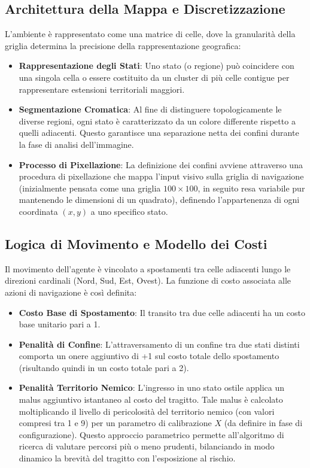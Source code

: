 \documentclass[12pt,a4paper]{article}
\begin{document}
	\subsection{Architettura della Mappa e Discretizzazione}
	L'ambiente è rappresentato come una matrice di celle, dove la granularità della griglia determina la precisione della rappresentazione geografica:
	\begin{itemize}
		\item \textbf{Rappresentazione degli Stati}: Uno stato (o regione) può coincidere con una singola cella o essere costituito da un cluster di più celle contigue per rappresentare estensioni territoriali maggiori.
		\item \textbf{Segmentazione Cromatica}: Al fine di distinguere topologicamente le diverse regioni, ogni stato è caratterizzato da un colore differente rispetto a quelli adiacenti. Questo garantisce una separazione netta dei confini durante la fase di analisi dell'immagine.
		\item \textbf{Processo di Pixellazione}: La definizione dei confini avviene attraverso una procedura di pixellazione che mappa l'input visivo sulla griglia di navigazione (inizialmente pensata come una griglia $100\times100$, in seguito resa variabile pur mantenendo le dimensioni di un quadrato), definendo l'appartenenza di ogni coordinata $(x, y)$ a uno specifico stato.
	\end{itemize}

	\subsection{Logica di Movimento e Modello dei Costi}
	Il movimento dell'agente è vincolato a spostamenti tra celle adiacenti lungo le direzioni cardinali (Nord, Sud, Est, Ovest). La funzione di costo associata alle azioni di navigazione è così definita:
	\begin{itemize}
		\item \textbf{Costo Base di Spostamento}: Il transito tra due celle adiacenti ha un costo base unitario pari a 1.
		\item \textbf{Penalità di Confine}: L'attraversamento di un confine tra due stati distinti comporta un onere aggiuntivo di +1 sul costo totale dello spostamento (risultando quindi in un costo totale pari a 2).
		\item \textbf{Penalità Territorio Nemico}: L'ingresso in uno stato ostile applica un malus aggiuntivo istantaneo al costo del tragitto. Tale malus è calcolato moltiplicando il livello di pericolosità del territorio nemico (con valori compresi tra 1 e 9) per un parametro di calibrazione $X$ (da definire in fase di configurazione). Questo approccio parametrico permette all'algoritmo di ricerca di valutare percorsi più o meno prudenti, bilanciando in modo dinamico la brevità del tragitto con l'esposizione al rischio.
	\end{itemize}
\end{document}
